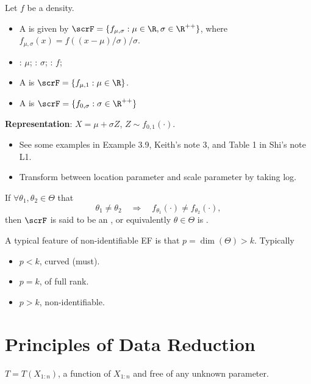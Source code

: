 \documentclass[10pt,a4paper]{article}
\begin{document}
\begin{defbox}
	\begin{definition}\label{def:ls-family}
		Let $f$ be a density. 
		\begin{itemize}
			\item A  is given by $\scrF=\{f_{\mu,\sigma}:\mu \in\R, \sigma\in\R^{++}\}$, where $f_{\mu,\sigma}(x)= f\left({(x-\mu)}/\sigma\right)/\sigma$.
			\item {}: $\mu$; : $\sigma$; : $f$;
			\item A  is $\scrF=\{f_{\mu,1}:\mu\in\R\}$.
			\item A  is $\scrF=\{f_{0,\sigma}:\sigma\in\R^{++}\}$ 
		\end{itemize}
	\end{definition}
\end{defbox}
\textbf{Representation}: $X=\mu + \sigma Z$, $Z\sim f_{0,1}(\cdot)$. 
\begin{itemize}
	\item See some examples in Example 3.9, Keith's note 3, and Table 1 in Shi's note L1. 
	\item Transform between location parameter and scale parameter by taking log.
\end{itemize}


\begin{defbox}
	\begin{definition}\label{def:id-family}
		If $\forall \theta_1,\theta_2\in\Theta$ that    
		\begin{equation*}
			\theta_1\neq\theta_2\quad\Rightarrow\quad f_{\theta_1}(\cdot)\neq f_{\theta_2}(\cdot),
		\end{equation*}
		then $\scrF$ is said to be an , or equivalently $\theta\in\Theta$ is . 
	\end{definition}
\end{defbox}
A typical feature of non-identifiable EF is that $p=\dim(\Theta)>k$. Typically
\begin{itemize}
	\item $p<k$, curved (must).
	\item $p=k$, of full rank.
	\item $p>k$, non-identifiable.  
\end{itemize} 

\section{Principles of Data Reduction}\label{sec:prin-data-reduce}
 $T=T(X_{1:n})$, a function of $X_{1:n}$ and free of any unknown parameter.  
\end{document}
